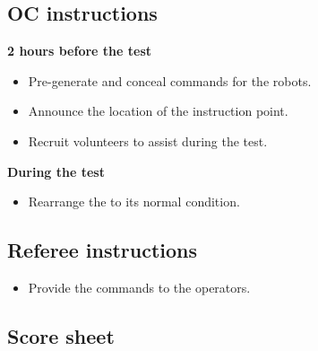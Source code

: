 \subsection*{OC instructions}
\textbf{2 hours before the test}
\begin{itemize}[nosep]
	\item Pre-generate and conceal commands for the robots.
	\item Announce the location of the instruction point.
	\item Recruit volunteers to assist during the test.
\end{itemize}
\textbf{During the test}
\begin{itemize}[nosep]
	\item Rearrange the \Arena{} to its normal condition.
\end{itemize}

\subsection*{Referee instructions}
\begin{itemize}[nosep]
	\item Provide the commands to the operators.
\end{itemize}


\subsection*{Score sheet}


